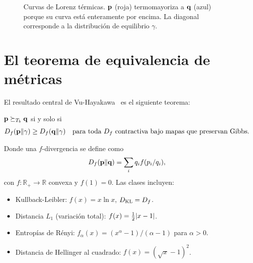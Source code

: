 \begin{figure}[h]
\centering
{}
\caption{Curvas de Lorenz térmicas. $\vb{p}$ (roja) termomayoriza a $\vb{q}$ 
(azul) porque su curva está enteramente por encima. La diagonal corresponde a 
la distribución de equilibrio $\gamma$.}
\label{fig:lorenz}
\end{figure}

\section{El teorema de equivalencia de métricas}

El resultado central de Vu-Hayakawa~\cite{vuhayakawa2025} es el siguiente 
teorema:

\begin{theorem}
\label{thm:vu_hayakawa}
$\vb{p} \succeq_{T_{b}} \vb{q}$ si y solo si
\begin{equation}
    D_{f}(\vb{p} \| \gamma) \geq D_{f}(\vb{q} \| \gamma) 
    \quad \text{para toda } D_{f} \text{ contractiva bajo mapas que preservan Gibbs.}
    \label{eq:vu_hayakawa}
\end{equation}
\end{theorem}

\noindent Donde una $f$-divergencia se define como
\begin{equation}
    D_{f}(\vb{p} \| \vb{q}) = \sum_{i} q_{i} f(p_{i}/q_{i}),
\end{equation}
%
con $f: \mathbb{R}_{+} \to \mathbb{R}$ convexa y $f(1) = 0$. Las clases 
incluyen:
\begin{itemize}
\item Kullback-Leibler: $f(x) = x \ln x$, $D_{\mathrm{KL}} = D_{f}$.
\item Distancia $L_1$ (variación total): $f(x) = \tfrac{1}{2}\abs{x-1}$.
\item Entropías de Rényi: $f_{\alpha}(x) = (x^{\alpha} - 1)/(\alpha - 1)$ para 
$\alpha > 0$.
\item Distancia de Hellinger al cuadrado: $f(x) = (\sqrt{x} - 1)^2$.
\end{itemize}

